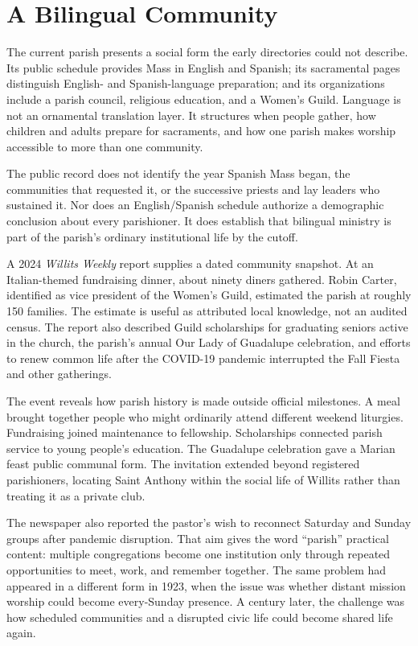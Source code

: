 \section{A Bilingual Community}

The current parish presents a social form the early directories could not describe. Its public schedule provides Mass in English and Spanish; its sacramental pages distinguish English- and Spanish-language preparation; and its organizations include a parish council, religious education, and a Women's Guild. Language is not an ornamental translation layer. It structures when people gather, how children and adults prepare for sacraments, and how one parish makes worship accessible to more than one community.

The public record does not identify the year Spanish Mass began, the communities that requested it, or the successive priests and lay leaders who sustained it. Nor does an English/Spanish schedule authorize a demographic conclusion about every parishioner. It does establish that bilingual ministry is part of the parish's ordinary institutional life by the cutoff.

A 2024 \emph{Willits Weekly} report supplies a dated community snapshot. At an Italian-themed fundraising dinner, about ninety diners gathered. Robin Carter, identified as vice president of the Women's Guild, estimated the parish at roughly 150 families. The estimate is useful as attributed local knowledge, not an audited census. The report also described Guild scholarships for graduating seniors active in the church, the parish's annual Our Lady of Guadalupe celebration, and efforts to renew common life after the COVID-19 pandemic interrupted the Fall Fiesta and other gatherings.

The event reveals how parish history is made outside official milestones. A meal brought together people who might ordinarily attend different weekend liturgies. Fundraising joined maintenance to fellowship. Scholarships connected parish service to young people's education. The Guadalupe celebration gave a Marian feast public communal form. The invitation extended beyond registered parishioners, locating Saint Anthony within the social life of Willits rather than treating it as a private club.

The newspaper also reported the pastor's wish to reconnect Saturday and Sunday groups after pandemic disruption. That aim gives the word ``parish'' practical content: multiple congregations become one institution only through repeated opportunities to meet, work, and remember together. The same problem had appeared in a different form in 1923, when the issue was whether distant mission worship could become every-Sunday presence. A century later, the challenge was how scheduled communities and a disrupted civic life could become shared life again.

